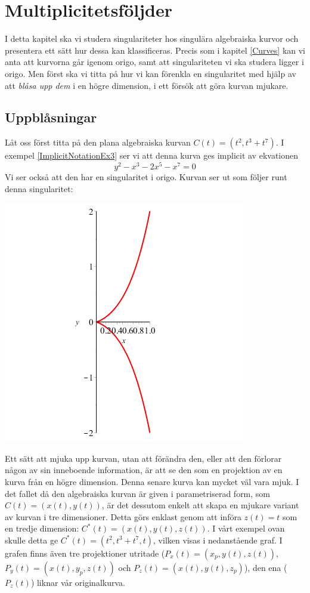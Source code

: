 \chapter{Multiplicitetsföljder}

I detta kapitel ska vi studera singulariteter hos singulära algebraiska kurvor och presentera ett sätt hur dessa kan klassificeras. Precis som i kapitel \ref{Curves} kan vi anta att kurvorna går igenom origo, samt att singulariteten vi ska studera ligger i origo. Men först ska vi titta på hur vi kan förenkla en singularitet med hjälp av att \emph{blåsa upp dem} i en högre dimension, i ett försök att göra kurvan mjukare.

\section{Uppblåsningar}

Låt oss först titta på den plana algebraiska kurvan $C(t)=(t^2,t^3+t^7)$. I exempel \ref{ImplicitNotationEx3} ser vi att denna kurva ges implicit av ekvationen
\[y^2-x^3-2x^5-x^7 = 0\]
Vi ser också att den har en singularitet i origo. Kurvan ser ut som följer runt denna singularitet:

\begin{center}
\includegraphics[scale=0.35]{Export/blowupex1_1.png}
\end{center}

Ett sätt att mjuka upp kurvan, utan att förändra den, eller att den förlorar någon av sin inneboende information, är att se den som en projektion av en kurva från en högre dimension. Denna senare kurva kan mycket väl vara mjuk. I det fallet då den algebraiska kurvan är given i parametriserad form, som $C(t)=\left(x(t),y(t)\right)$, är det dessutom enkelt att skapa en mjukare variant av kurvan i tre dimensioner. Detta görs enklast genom att införa $z(t)=t$ som en tredje dimension: $C^*(t)=\left(x(t),y(t),z(t)\right)$. I vårt exempel ovan skulle detta ge $C^*(t)=(t^2,t^3+t^7,t)$, vilken visas i nedanstående graf. I grafen finns även tre projektioner utritade ($P_x(t)=(x_p,y(t),z(t))$, $P_y(t)=(x(t),y_p,z(t))$ och $P_z(t)=(x(t),y(t),z_p)$), den ena ($P_z(t)$) liknar vår originalkurva.

